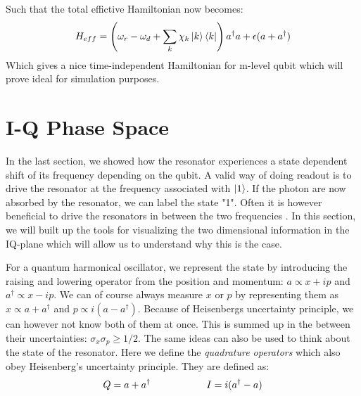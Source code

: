 Such that the total effictive Hamiltonian now becomes:
\begin{equation}
    H_{eff} =  \left(\omega_r - \omega_d + \sum_k \chi_k \ket{k}\bra{k}\right)a^\dagger a + \epsilon(a + a^\dagger)
\end{equation}
Which gives a nice time-independent Hamiltonian for m-level qubit which will prove ideal for simulation purposes. %



\section{I-Q Phase Space}
In the last section, we showed how the resonator experiences a state dependent shift of its frequency depending on the qubit. A valid way of doing readout is to drive the resonator at the frequency associated with $\ket{1}$. If the photon are now absorbed by the resonator, we can label the state "1". Often it is however beneficial to drive the resonators in between the two frequencies \cite{blais2004}. In this section, we will built up the tools for visualizing the two dimensional information in the IQ-plane which will allow us to understand why this is the case.

For a quantum harmonical oscillator, we represent the state by introducing the raising and lowering operator from the position and momentum: $a \propto x + ip$ and $a^\dagger \propto x - ip$. We can of course always measure $x$ or $p$ by representing them as $x \propto a + a^\dagger$ and $p\propto i (a - a^\dagger)$. Because of Heisenbergs uncertainty principle, we can however not know both of them at once. This is summed up in the between their uncertainties: $\sigma_x \sigma_p \geq 1/2$.  The same ideas can also be used to think about the state of the resonator. Here we define the \textit{quadrature operators} which also obey Heisenberg's uncertainty principle. They are defined  as\cite{knight}: 
\begin{equation}
    Q = a + a^\dagger \hspace{2 cm} I = i(a^\dagger - a)
\end{equation}

